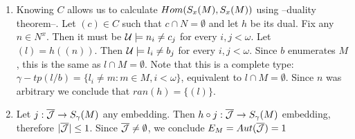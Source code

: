 \documentclass[../main.tex]{subfiles}
\begin{document}
\begin{example}
\begin{enumerate}
		\item	Knowing $C$ allows us to calculate $Hom(S_x(M),S_x(M))$ using --duality theorem--.
			Let $(c) \in C$ such that $c \cap N = \emptyset$ and let $h$ be its dual.
			Fix any $n \in N^x$. Then it must be $\mathcal{U} \models n_i \not = c_j$ for every $i,j < \omega$.
			Let $(l) = h((n))$. Then $\mathcal{U} \models l_i \not = b_j$ for every $i,j < \omega$.
			Since $b$ enumerates $M$, this is the same as $l \cap M = \emptyset$. 
			Note that this is a complete type: $\gamma-tp(l/b) = \{l_i \not = m : m \in M, i < \omega\}$, equivalent to $l \cap M = \emptyset$.
			Since $n$ was arbitrary we conclude that $ran(h) = \{(l)\}$.

		\item	Let $j: \mathcal{\overline{J}} \to S_{\gamma}(M)$ any embedding. Then $h \circ j: \mathcal{\overline{J}} \to S_{\gamma}(M)$ embedding, therefore $|\mathcal{\overline{J}}| \leq 1$. 
			Since $\mathcal{\overline{J}} \not = \emptyset$, we conclude $E_M = Aut(\mathcal{\overline{J}}) = 1$	
	\end{enumerate}
\end{example}
\end{document}
